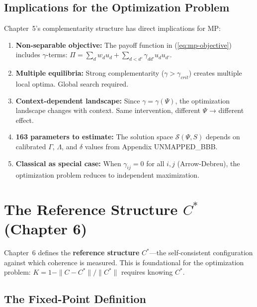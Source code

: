 \subsection{Implications for the Optimization Problem}

Chapter~5's complementarity structure has direct implications for MP:

\begin{enumerate}
\item \textbf{Non-separable objective:} The payoff function in (\ref{eq:mp-objective}) includes
      $\gamma$-terms: $\Pi = \sum_d w_d u_d + \sum_{d<d'} \gamma_{dd'} u_d u_{d'}$.

\item \textbf{Multiple equilibria:} Strong complementarity ($\gamma > \gamma_{crit}$) creates
      multiple local optima. Global search required.

\item \textbf{Context-dependent landscape:} Since $\gamma = \gamma(\Psi)$, the optimization
      landscape changes with context. Same intervention, different $\Psi$ → different effect.

\item \textbf{163 parameters to estimate:} The solution space $\mathcal{S}(\Psi, S)$ depends
      on calibrated $\Gamma$, $\Lambda$, and $\delta$ values from Appendix UNMAPPED_BBB.

\item \textbf{Classical as special case:} When $\gamma_{ij} = 0$ for all $i,j$ (Arrow-Debreu),
      the optimization problem reduces to independent maximization.
\end{enumerate}

\section{The Reference Structure $C^*$ (Chapter 6)}
\label{sec:mp-reference}

Chapter~6 defines the \textbf{reference structure} $C^*$---the self-consistent configuration
against which coherence is measured. This is foundational for the optimization problem:
$K = 1 - \|C - C^*\|/\|C^*\|$ requires knowing $C^*$.

\subsection{The Fixed-Point Definition}


